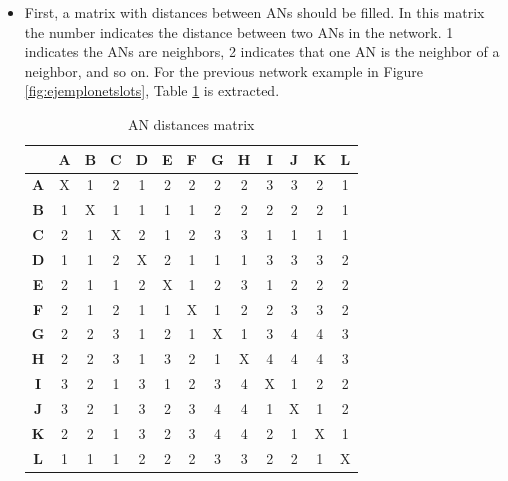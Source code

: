 \begin{itemize}
 \item First, a matrix with distances between \acp{AN} should be filled. In this matrix the number indicates the distance between
two \acp{AN} in the network. 1 indicates the \acp{AN} are neighbors, 2 indicates that one \ac{AN} is the neighbor of a neighbor, and so on. For 
the previous network example in Figure \ref{fig:ejemplonetslots}, Table \ref{tab:neighborsmatrix} is extracted.

\begin{table}
 \begin{center}
  \begin{tabular}{c|c|c|c|c|c|c|c|c|c|c|c|c|}
   & \textbf{A} & \textbf{B} & \textbf{C} & \textbf{D} & \textbf{E} & \textbf{F} & \textbf{G} & \textbf{H} & \textbf{I} & 
    \textbf{J} & \textbf{K} & \textbf{L} \\
   \hline
   \textbf{A} & X & 1 & 2 & 1 & 2 & 2 & 2 & 2 & 3 & 3 & 2 & 1 \\
   \hline
   \textbf{B} & 1 & X & 1 & 1 & 1 & 1 & 2 & 2 & 2 & 2 & 2 & 1 \\
   \hline
   \textbf{C} & 2 & 1 & X & 2 & 1 & 2 & 3 & 3 & 1 & 1 & 1 & 1 \\
   \hline
   \textbf{D} & 1 & 1 & 2 & X & 2 & 1 & 1 & 1 & 3 & 3 & 3 & 2 \\
   \hline
   \textbf{E} & 2 & 1 & 1 & 2 & X & 1 & 2 & 3 & 1 & 2 & 2 & 2 \\
   \hline
   \textbf{F} & 2 & 1 & 2 & 1 & 1 & X & 1 & 2 & 2 & 3 & 3 & 2 \\
   \hline
   \textbf{G} & 2 & 2 & 3 & 1 & 2 & 1 & X & 1 & 3 & 4 & 4 & 3 \\
   \hline
   \textbf{H} & 2 & 2 & 3 & 1 & 3 & 2 & 1 & X & 4 & 4 & 4 & 3 \\
   \hline
   \textbf{I} & 3 & 2 & 1 & 3 & 1 & 2 & 3 & 4 & X & 1 & 2 & 2 \\
   \hline
   \textbf{J} & 3 & 2 & 1 & 3 & 2 & 3 & 4 & 4 & 1 & X & 1 & 2 \\
   \hline
   \textbf{K} & 2 & 2 & 1 & 3 & 2 & 3 & 4 & 4 & 2 & 1 & X & 1 \\
   \hline
   \textbf{L} & 1 & 1 & 1 & 2 & 2 & 2 & 3 & 3 & 2 & 2 & 1 & X \\
   \hline
  \end{tabular}
  \caption{\ac{AN} distances matrix}
  \label{tab:neighborsmatrix}
 \end{center}
\end{table}

\end{itemize}
